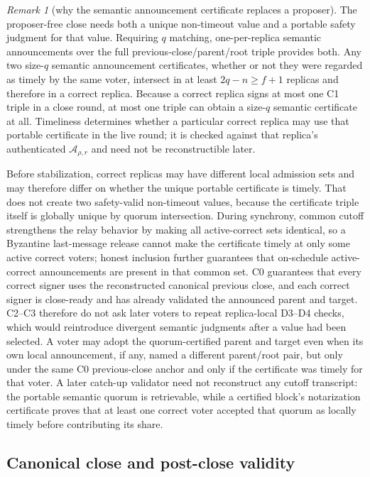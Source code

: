 \documentclass[11pt]{article}
\theoremstyle{definition}
\theoremstyle{remark}
\newtheorem{remark}[theorem]{Remark}
\begin{document}
\begin{remark}[why the semantic announcement certificate replaces a proposer]
The proposer-free close needs both a unique non-timeout value and a portable safety judgment for that value. Requiring $q$ matching, one-per-replica semantic announcements over the full previous-close/parent/root triple provides both. Any two size-$q$ semantic announcement certificates, whether or not they were regarded as timely by the same voter, intersect in at least $2q-n\ge f+1$ replicas and therefore in a correct replica. Because a correct replica signs at most one C1 triple in a close round, at most one triple can obtain a size-$q$ semantic certificate at all. Timeliness determines whether a particular correct replica may use that portable certificate in the live round; it is checked against that replica's authenticated $\mathcal A_{\rho,r}$ and need not be reconstructible later.

Before stabilization, correct replicas may have different local admission sets and may therefore differ on whether the unique portable certificate is timely. That does not create two safety-valid non-timeout values, because the certificate triple itself is globally unique by quorum intersection. During synchrony, common cutoff strengthens the relay behavior by making all active-correct sets identical, so a Byzantine last-message release cannot make the certificate timely at only some active correct voters; honest inclusion further guarantees that on-schedule active-correct announcements are present in that common set. C0 guarantees that every correct signer uses the reconstructed canonical previous close, and each correct signer is close-ready and has already validated the announced parent and target. C2--C3 therefore do not ask later voters to repeat replica-local D3--D4 checks, which would reintroduce divergent semantic judgments after a value had been selected. A voter may adopt the quorum-certified parent and target even when its own local announcement, if any, named a different parent/root pair, but only under the same C0 previous-close anchor and only if the certificate was timely for that voter. A later catch-up validator need not reconstruct any cutoff transcript: the portable semantic quorum is retrievable, while a certified block's notarization certificate proves that at least one correct voter accepted that quorum as locally timely before contributing its share.
\end{remark}

\subsection{Canonical close and post-close validity}
\end{document}
